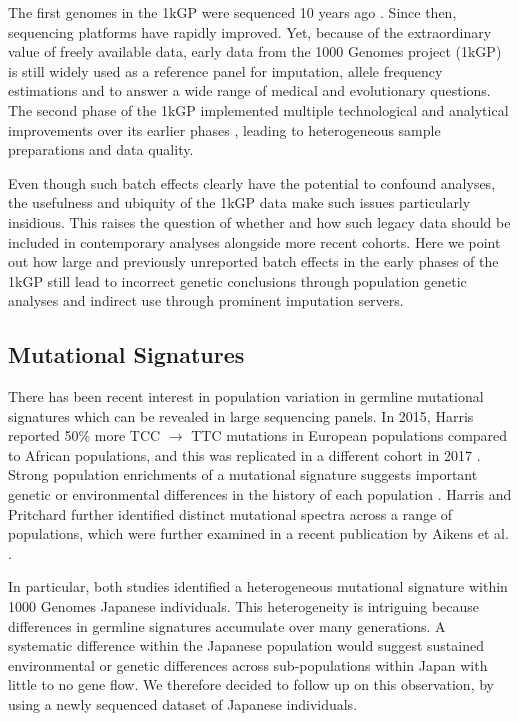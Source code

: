 \documentclass[
11pt, %
oneside, %
english, %
doublespacing, %
headsepline, %
]{MastersDoctoralThesis} %
\begin{document}
The first genomes in the 1kGP were sequenced 10 years ago \citep{VanDijk2014}. 
Since then, sequencing platforms have rapidly improved. 
Yet, because of the extraordinary value of freely available data, early data from the 1000 Genomes project (1kGP) is still widely used as a reference panel for imputation, allele frequency estimations and to answer a wide range of medical and evolutionary questions. 
The second phase of the 1kGP implemented multiple technological and analytical improvements over its earlier phases \citep{The1000GenomesProjectConsortium2012}, leading to heterogeneous sample preparations and data quality.

Even though such batch effects clearly have the potential to confound analyses, the usefulness and ubiquity of the 1kGP data make such issues particularly insidious.   
This raises the question of whether and how such legacy data should be included in contemporary analyses alongside more recent cohorts.
Here we point out how large and previously unreported batch effects in the early phases of the 1kGP still lead to incorrect genetic conclusions through population genetic analyses and indirect use through prominent imputation servers.


\subsection{Mutational Signatures}
There has been recent interest in population variation in germline mutational signatures which can be revealed in large sequencing panels. 
In 2015, Harris reported 50\% more TCC ${\rightarrow}$ TTC mutations in European populations compared to African populations, and this was replicated in a different cohort in 2017 \citep{Harris2015a, Harris2017a, Mathieson2017a}. 
Strong population enrichments of a mutational signature suggests important genetic or environmental differences in the history of each population \citep{Harris2015a, Harris2017a}. 
Harris and Pritchard further identified distinct mutational spectra across a range of populations, which were further examined in a recent publication by Aikens et al. \citep{Harris2017a,Aikens2018}.
 
In particular, both studies  identified a heterogeneous mutational signature within 1000 Genomes Japanese individuals.
This heterogeneity is intriguing because differences in germline signatures accumulate over many generations.
A systematic difference within the Japanese population would suggest sustained environmental or genetic differences across sub-populations within Japan with little to no gene flow.
We therefore decided to follow up on this observation, by using a newly sequenced dataset of Japanese individuals. 
\end{document}
